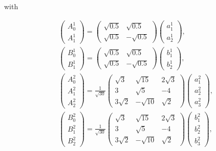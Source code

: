 \documentclass[prd,twocolumn,showpacs,amsmath,amssymb]{revtex4-1}
\begin{document}
\noindent with

\begin{equation}
\begin{split}
&\begin{pmatrix}
A_0^{1}\\
A_1^{1}
\end{pmatrix}
=\begin{pmatrix}
\sqrt{0.5} & \sqrt{0.5} \\
\sqrt{0.5} & -\sqrt{0.5}
\end{pmatrix}
  \begin{pmatrix}
  a_1^{1} \\
  a_2^{1}
\end{pmatrix}, \\
&\begin{pmatrix}
B_0^{1}\\
B_1^{1}
\end{pmatrix}
=\begin{pmatrix}
\sqrt{0.5} & \sqrt{0.5} \\
\sqrt{0.5} & -\sqrt{0.5}
\end{pmatrix}
  \begin{pmatrix}
  b_1^{1} \\
  b_2^{1}
\end{pmatrix}, \\
& \begin{pmatrix}
  A_0^{2} \\
  A_1^{2} \\
  A_2^{2}
\end{pmatrix}
=\frac{1}{\sqrt{30}}\begin{pmatrix}
\sqrt{3} & \sqrt{15} & 2\sqrt{3} \\
3 & \sqrt{5} & -4 \\
3\sqrt{2} & -\sqrt{10} & \sqrt{2}
\end{pmatrix}
  \begin{pmatrix}
  a_1^{2} \\
  a_2^{2} \\
  a_3^{2}
\end{pmatrix},\\
&\begin{pmatrix}
  B_0^{2} \\
  B_1^{2} \\
  B_2^{2}
\end{pmatrix}
=\frac{1}{\sqrt{30}}\begin{pmatrix}
\sqrt{3} & \sqrt{15} & 2\sqrt{3} \\
3 & \sqrt{5} & -4 \\
3\sqrt{2} & -\sqrt{10} & \sqrt{2}
\end{pmatrix}
  \begin{pmatrix}
  b_1^{2} \\
  b_2^{2} \\
  b_3^{2}
\end{pmatrix},\\
\end{split}
\end{equation}
\end{document}
